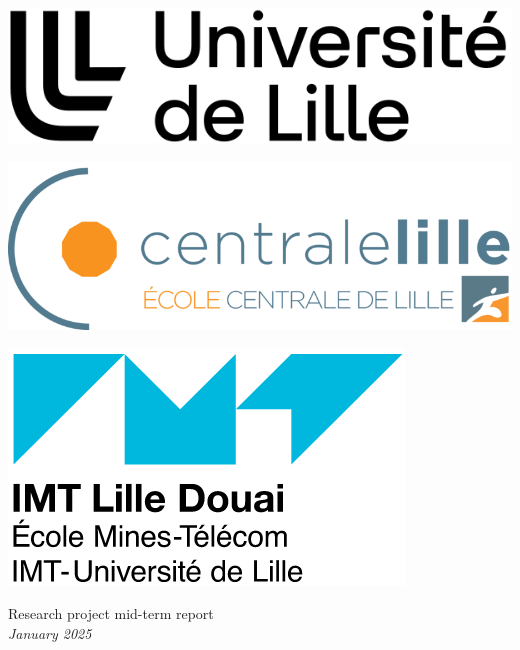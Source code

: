 \begin{titlepage}
\centering
\begin{minipage}{.25\linewidth}
\includegraphics[width=\linewidth]{figs/ulille.png}
\end{minipage}
\hfill
\begin{minipage}{.25\linewidth}
\centering
\includegraphics[width=\linewidth]{figs/Centrale-Lille-Ecole.png}
\end{minipage}
\hfill
\begin{minipage}{.25\linewidth}
\includegraphics[width=\linewidth]{figs/imt.png}
\end{minipage}

\vfill


{\large Research project mid-term report \\ \textit{January 2025} \vspace{1\baselineskip}}


\end{titlepage}

